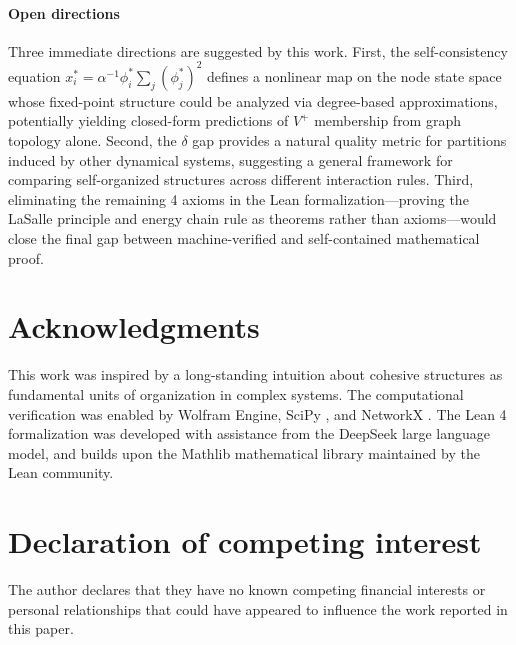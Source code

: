 \documentclass[3p]{elsarticle}
\begin{document}
\paragraph{Open directions}
Three immediate directions are suggested by this work. First, the self-consistency equation $x_i^* = \alpha^{-1} \phi_i^* \sum_j (\phi_j^*)^2$ defines a nonlinear map on the node state space whose fixed-point structure could be analyzed via degree-based approximations, potentially yielding closed-form predictions of $V^+$ membership from graph topology alone. Second, the $\delta$ gap provides a natural quality metric for partitions induced by other dynamical systems, suggesting a general framework for comparing self-organized structures across different interaction rules. Third, eliminating the remaining 4 axioms in the Lean formalization---proving the LaSalle principle and energy chain rule as theorems rather than axioms---would close the final gap between machine-verified and self-contained mathematical proof.

\section{Acknowledgments}

This work was inspired by a long-standing intuition about cohesive structures as fundamental units of organization in complex systems. The computational verification was enabled by Wolfram Engine, SciPy \cite{virtanen2020scipy}, and NetworkX \cite{hagberg2008exploring}. The Lean 4 formalization was developed with assistance from the DeepSeek large language model, and builds upon the Mathlib mathematical library maintained by the Lean community.

\section*{Declaration of competing interest}

The author declares that they have no known competing financial interests or personal relationships that could have appeared to influence the work reported in this paper.



\end{document}
